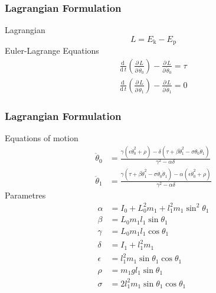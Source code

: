 \documentclass[]{beamer}
\newcommand{\dif}[2]{\ensuremath{\frac{\mathrm{d}\, #1}{\mathrm{d}\, #2}}}
\newcommand{\diff}[2]{\ensuremath{\frac{\partial\, #1}{\partial\, #2}}}
\newcommand{\lrp}[1]{\ensuremath{\left( #1 \right)}}
\newcommand{\ui}[2]{#1 _{\text{#2}}}
\begin{document}
\begin{frame}
	\frametitle{Lagrangian Formulation}
Lagrangian
\begin{equation*}
L = \ui{E}{k} - \ui{E}{p}
\end{equation*}
Euler-Lagrange Equations
\begin{subequations}
	\begin{align*}
	\dif{}{t}\lrp{\diff{L}{\dot{\theta}_0}}-\diff{L}{\dot{\theta}_0} = \tau\\
	\dif{}{t}\lrp{\diff{L}{\dot{\theta}_1}}-\diff{L}{\dot{\theta}_1} = 0
	\end{align*}
\end{subequations}
\end{frame}
\begin{frame}
	\frametitle{Lagrangian Formulation}
	Equations of motion
	\begin{subequations}
		\begin{align*}
		\ddot{\theta}_0 &= \frac{\gamma(\epsilon\dot{\theta}_0^2+\rho)-\delta(\tau+\beta\dot{\theta}_1^2-\sigma\dot{\theta}_0\dot{\theta}_1)}{\gamma^2-\alpha\delta}\\
		\ddot{\theta}_1 &= \frac{\gamma(\tau+\beta\dot{\theta}_1^2-\sigma\dot{\theta}_0\dot{\theta}_1)-\alpha(\epsilon\dot{\theta}_0^2+\rho)}{\gamma^2-\alpha\delta}
		\end{align*}
	\end{subequations}
Parametres
\begin{subequations}
	\begin{align*}
	\alpha &= I_0+L_0^2m_1+l_1^2m_1\sin^2\theta_1\\
	\beta &= L_0m_1l_1\sin\theta_1 \\
	\gamma &= L_0m_1l_1\cos\theta_1\\
	\delta &= I_1+l_1^2m_1\\
	\epsilon &= l^2_1m_1\sin\theta_1\cos\theta_1\\
	\rho &= m_1gl_1\sin\theta_1\\
	\sigma &= 2l^2_1m_1\sin\theta_1\cos\theta_1
	\end{align*}
\end{subequations}
\end{frame}
\end{document}
